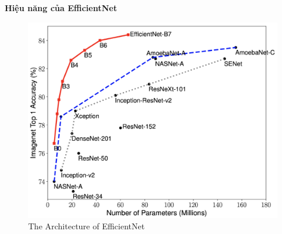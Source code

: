 \documentclass{article}
\begin{document}
	\textbf{Hiệu năng của EfficientNet}
	
	\begin{figure}[H]
		\centering
		\includegraphics[width=0.5\linewidth]{images/image3.png}
		\caption{The Architecture of EfficientNet }
		\label{fig:writing-thesis}
	\end{figure}
	\nocite{*}
	\newpage\cleardoublepage
	
\end{document}
